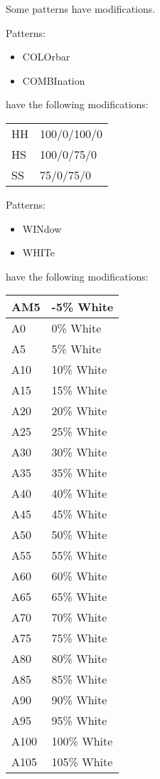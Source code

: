 Some patterns have modifications.

Patterns:

\begin{itemize}
\item COLOrbar
\item COMBInation
\end{itemize}

have the following modifications:

\begin{tabular}{l @{ - } l}
HH  & 100/0/100/0\\
HS  & 100/0/75/0\\
SS  & 75/0/75/0 \\
\end{tabular}

Patterns:

\begin{itemize}
\item WINdow
\item WHITe
\end{itemize}

have the following modifications:

\begin{tabular}{|l|l|}
\hline
AM5   &    -5\% White    \\ \hline
A0    &     0\% White    \\ \hline
A5    &     5\% White    \\ \hline
A10   &    10\% White    \\ \hline
A15   &    15\% White    \\ \hline
A20   &    20\% White    \\ \hline
A25   &    25\% White    \\ \hline
A30   &    30\% White    \\ \hline
A35   &    35\% White    \\ \hline
A40   &    40\% White     \\ \hline
A45   &    45\% White     \\ \hline
A50   &    50\% White     \\ \hline
A55   &    55\% White     \\ \hline
A60   &    60\% White     \\ \hline
A65   &    65\% White     \\ \hline
A70   &    70\% White     \\ \hline
A75   &    75\% White     \\ \hline
A80   &    80\% White     \\ \hline
A85   &    85\% White     \\ \hline
A90   &    90\% White     \\ \hline
A95   &    95\% White     \\ \hline
A100  &   100\% White    \\ \hline
A105  &   105\% White    \\ \hline
\end{tabular}  

